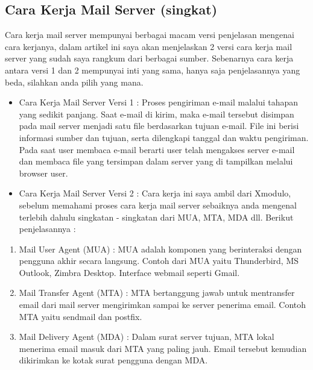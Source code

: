 \begin{enumerate}
\subsection {Cara Kerja Mail Server (singkat)} 
Cara kerja mail server mempunyai berbagai macam versi penjelasan mengenai cara kerjanya, dalam artikel ini saya akan menjelaskan 2 versi cara kerja mail server yang sudah saya rangkum dari berbagai sumber. Sebenarnya cara kerja antara versi 1 dan 2 mempunyai inti yang sama, hanya saja penjelasannya yang beda, silahkan anda pilih yang mana.\par  
\begin{itemize}
\item Cara Kerja Mail Server Versi 1 :
Proses pengiriman e-mail malalui tahapan yang sedikit panjang. Saat e-mail di kirim, maka e-mail tersebut disimpan pada mail server menjadi satu file berdasarkan tujuan e-mail. File ini berisi informasi sumber dan tujuan, serta dilengkapi tanggal dan waktu pengiriman. Pada saat user membaca e-mail berarti user telah mengakses server e-mail dan membaca file yang tersimpan dalam server yang di tampilkan melalui browser user. \par
\vspace{12pt}
\noindent 
\item Cara Kerja Mail Server Versi 2 :
Cara kerja ini saya ambil dari Xmodulo, sebelum memahami proses cara kerja mail server sebaiknya anda mengenal terlebih dahulu singkatan - singkatan dari MUA, MTA, MDA dll. Berikut penjelasannya : \par
\end{itemize}
\vspace{12pt}
\noindent 
\begin{enumerate}
\item Mail User Agent (MUA) : MUA adalah komponen yang berinteraksi dengan pengguna akhir secara langsung. Contoh dari MUA yaitu Thunderbird, MS Outlook, Zimbra Desktop. Interface webmail seperti Gmail. \par
\noindent 
\item Mail Transfer Agent (MTA) : MTA bertanggung jawab untuk mentransfer email dari mail server mengirimkan sampai ke server penerima email. Contoh MTA yaitu sendmail dan postfix. \par
\noindent 
\item Mail Delivery Agent (MDA) : Dalam surat server tujuan, MTA lokal menerima email masuk dari MTA yang paling jauh. Email tersebut kemudian dikirimkan ke kotak surat pengguna dengan MDA. \par

\end{enumerate}
\end{enumerate}
